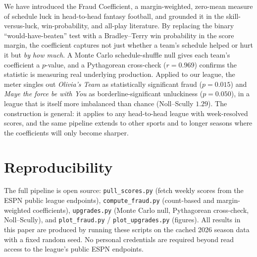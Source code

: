 \documentclass[11pt]{article}
\newcommand{\team}[1]{\emph{#1}}
\begin{document}
We have introduced the Fraud Coefficient, a margin-weighted, zero-mean measure
of schedule luck in head-to-head fantasy football, and grounded it in the
skill-versus-luck, win-probability, and all-play literature. By replacing the
binary ``would-have-beaten'' test with a Bradley--Terry win probability in the
score margin, the coefficient captures not just whether a team's schedule
helped or hurt it but \emph{by how much}. A Monte Carlo schedule-shuffle null
gives each team's coefficient a $p$-value, and a Pythagorean cross-check
($r=0.969$) confirms the statistic is measuring real underlying production.
Applied to our league, the meter singles out \team{Olivia's Team} as
statistically significant fraud ($p=0.015$) and \team{Maye the force be with
You} as borderline-significant unluckiness ($p=0.050$), in a league that is
itself more imbalanced than chance (Noll--Scully $1.29$). The construction is
general: it applies to any head-to-head league with week-resolved scores, and
the same pipeline extends to other sports and to longer seasons where the
coefficients will only become sharper.

\section{Reproducibility}
\label{sec:repro}

The full pipeline is open source:
\texttt{pull\_scores.py} (fetch weekly scores from the ESPN public league
endpoints), \texttt{compute\_fraud.py} (count-based and margin-weighted
coefficients), \texttt{upgrades.py} (Monte Carlo null, Pythagorean cross-check,
Noll--Scully), and \texttt{plot\_fraud.py} / \texttt{plot\_upgrades.py}
(figures). All results in this paper are produced by running these scripts on
the cached 2026 season data with a fixed random seed. No personal credentials
are required beyond read access to the league's public ESPN endpoints.
\end{document}

